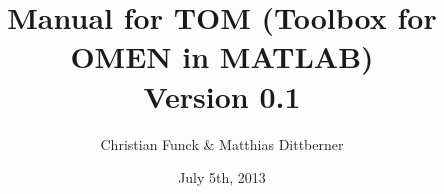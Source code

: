 


\title{Manual for TOM (Toolbox for OMEN in MATLAB) \\ {\small Version 0.1}}
\author{Christian Funck \& Matthias Dittberner}
\date{July 5th, 2013}


	\maketitle
	\tableofcontents
	
	
	
	\printglossaries \label{glossary}




